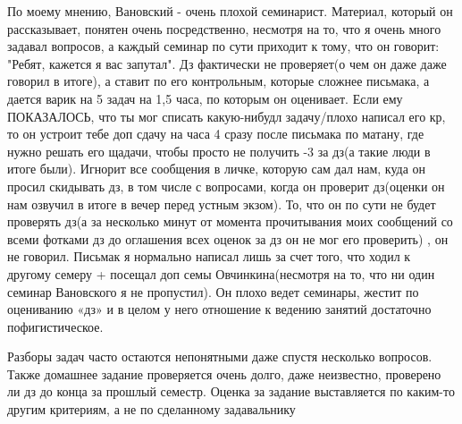         \begin{commentbox} 
            По моему мнению, Вановский - очень плохой семинарист. Материал, который он рассказывает, понятен очень посредственно, несмотря на то, что я очень много задавал вопросов, а каждый семинар по сути приходит к тому, что он говорит: "Ребят, кажется я вас запутал". Дз фактически не проверяет(о чем он даже даже говорил в итоге), а ставит по его контрольным, которые сложнее письмака, а дается варик на 5 задач на 1,5 часа, по которым он оценивает. Если ему ПОКАЗАЛОСЬ, что ты мог списать какую-нибудл задачу/плохо написал его кр, то он устроит тебе доп сдачу на часа 4 сразу после письмака по матану, где нужно решать его щадачи, чтобы просто не получить -3 за дз(а такие люди в итоге были). Игнорит все сообщения в личке, которую сам дал нам, куда он просил скидывать дз, в том числе с вопросами, когда он проверит дз(оценки он нам озвучил в итоге в вечер перед устным экзом). То, что он по сути не будет проверять дз(а за несколько минут от момента прочитывания моих сообщений со всеми фотками дз до оглашения всех оценок за дз он не мог его проверить) , он не говорил. Письмак я нормально написал лишь за счет того, что ходил к другому семеру + посещал доп семы Овчинкина(несмотря на то, что ни один семинар Вановского я не пропустил). Он плохо ведет семинары, жестит по оцениванию «дз» и в целом у него отношение к ведению занятий достаточно пофигистическое.  
        \end{commentbox} 
       
        \begin{commentbox}
            Разборы задач часто остаются непонятными даже спустя несколько вопросов. Также домашнее задание проверяется очень долго, даже неизвестно, проверено ли дз до конца за прошлый семестр. Оценка за задание выставляется по каким-то другим критериям, а не по сделанному задавальнику 
        \end{commentbox} 
				


